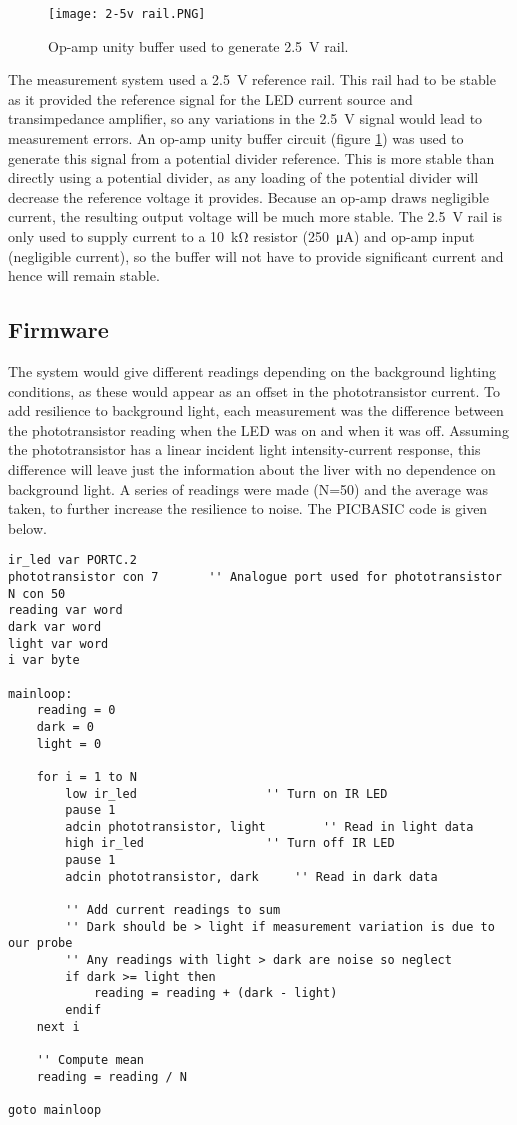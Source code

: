 \begin{figure}[htb]
	\centering
	\texttt{[image: 2-5v rail.PNG]}
	\caption{Op-amp unity buffer used to generate \SI{2.5}{\volt} rail.}
	\label{fig: 2.5v rail}
\end{figure}

The measurement system used a \SI{2.5}{\volt} reference rail. This rail had to be stable as it provided the reference signal for the LED current source and transimpedance amplifier, so any variations in the \SI{2.5}{\volt} signal would lead to measurement errors. An op-amp unity buffer circuit (figure \ref{fig: 2.5v rail}) was used to generate this signal from a potential divider reference. This is more stable than directly using a potential divider, as any loading of the potential divider will decrease the reference voltage it provides. Because an op-amp draws negligible current, the resulting output voltage will be much more stable. The \SI{2.5}{\volt} rail is only used to supply current to a \SI{10}{\kilo\ohm} resistor (\SI{250}{\micro\ampere}) and op-amp input (negligible current), so the buffer will not have to provide significant current and hence will remain stable.




\subsection{Firmware}
The system would give different readings depending on the background lighting conditions, as these would appear as an offset in the phototransistor current. To add resilience to background light, each measurement was the difference between the phototransistor reading when the LED was on and when it was off. Assuming the phototransistor has a linear incident light intensity-current response, this difference will leave just the information about the liver with no dependence on background light. A series of readings were made (N=50) and the average was taken, to further increase the resilience to noise. The PICBASIC code is given below.

\begin{lstlisting}
ir_led var PORTC.2
phototransistor con 7       '' Analogue port used for phototransistor
N con 50
reading var word
dark var word
light var word
i var byte

mainloop:
	reading = 0
	dark = 0
	light = 0
	
	for i = 1 to N
	    low ir_led					'' Turn on IR LED
	    pause 1
	    adcin phototransistor, light		'' Read in light data
	    high ir_led					'' Turn off IR LED
	    pause 1
	    adcin phototransistor, dark		'' Read in dark data
	    
	    '' Add current readings to sum
	    '' Dark should be > light if measurement variation is due to our probe
	    '' Any readings with light > dark are noise so neglect
	    if dark >= light then
	        reading = reading + (dark - light)
	    endif
	next i  
	
	'' Compute mean
	reading = reading / N

goto mainloop
\end{lstlisting}






